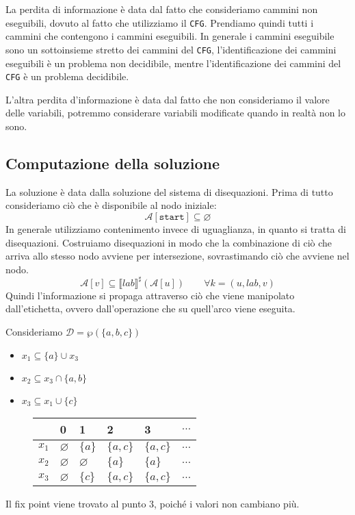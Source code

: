 La perdita di informazione è data dal fatto che consideriamo cammini non eseguibili, dovuto al fatto che 
utilizziamo il \texttt{CFG}. Prendiamo quindi tutti i cammini che contengono i cammini eseguibili.
In generale i cammini eseguibile sono un sottoinsieme stretto dei cammini del \texttt{CFG}, l'identificazione 
dei cammini eseguibili è un problema non decidibile, mentre l'identificazione dei cammini del \texttt{CFG} è un problema
decidibile.

L'altra perdita d'informazione è data dal fatto che non consideriamo il valore delle variabili, potremmo
considerare variabili modificate quando in realtà non lo sono.
\subsection{Computazione della soluzione}
La soluzione è data dalla soluzione del sistema di disequazioni.
Prima di tutto consideriamo ciò che è disponibile al nodo iniziale:
\[
\mathcal{A}[\texttt{start}] \subseteq \varnothing
\] 
In generale utilizziamo contenimento invece di uguaglianza, in quanto si tratta di disequazioni. Costruiamo
disequazioni in modo che la combinazione di ciò che arriva allo stesso nodo avviene per intersezione, sovrastimando ciò 
che avviene nel nodo. 
\[
\mathcal{A}[v] \subseteq \llbracket lab \rrbracket^\sharp (\mathcal{A}[u]) \qquad \forall k = (u,lab,v)
\]
Quindi l'informazione si propaga attraverso ciò che viene manipolato dall'etichetta, ovvero dall'operazione che su quell'arco viene 
eseguita.

Consideriamo $\mathcal{D} = \wp(\{a,b,c\})$
\begin{itemize}
    \item $x_1 \subseteq \{ a \} \cup x_3$
    \item $x_2 \subseteq x_3 \cap \{a, b \}$
    \item $x_3 \subseteq x_1 \cup \{ c\}$
\end{itemize}
\begin{figure}[H]
    \centering
    \renewcommand{\arraystretch}{2}
    \begin{tabular}{|>{\centering\arraybackslash}m{5em}|m{5em}|m{5em}|m{5em}|m{5em}|m{5em}|}
        \hline
        & \textbf{0} & \textbf{1} & \textbf{2} & \textbf{3} & \textbf{$\dots$} \\
        \hline
        $x_1$ & $\varnothing$ & $\{a\}$ & $\{a, c\}$ & $\{a, c\}$ & $\dots$ \\
        \hline
        $x_2$ & $\varnothing$ & $\varnothing$ & $\{a\}$ 
        & $\{a\}$ & $\dots$ \\
        \hline
        $x_3$ & $\varnothing$ &$\{c\}$ & $\{a, c\}$ & $\{a, c\}$ & $\dots$ \\
        \hline
    \end{tabular}
\end{figure}
Il fix point viene trovato al punto $3$, poiché i valori non cambiano più.

